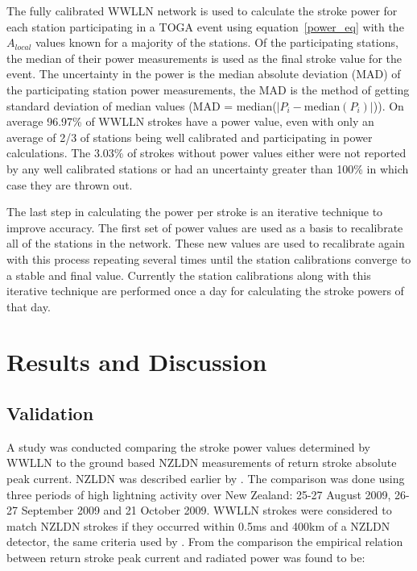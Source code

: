 The fully calibrated WWLLN network is used to calculate the stroke power for each station participating in a TOGA event using equation~\ref{power_eq} with the $A_{local}$ values known for a majority of the stations.
Of the participating stations, the median of their power measurements is used as the final stroke value for the event.
The uncertainty in the power is the median absolute deviation (MAD) of the participating station power measurements, the MAD is the method of getting standard deviation of median values (MAD = median($|P_i - $median$(P_i)|$)).
On average 96.97\% of WWLLN strokes have a power value, even with only an average of 2/3 of stations being well calibrated and participating in power calculations.
The 3.03\% of strokes without power values either were not reported by any well calibrated stations or had an uncertainty greater than 100\% in which case they are thrown out.

The last step in calculating the power per stroke is an iterative technique to improve accuracy.
The first set of power values are used as a basis to recalibrate all of the stations in the network.
These new values are used to recalibrate again with this process repeating several times until the station calibrations converge to a stable and final value.
Currently the station calibrations along with this iterative technique are performed once a day for calculating the stroke powers of that day.

\section{Results and Discussion}

\subsection{Validation}

A study was conducted comparing the stroke power values determined by WWLLN to the ground based NZLDN measurements of return stroke absolute peak current. NZLDN was described earlier by \citet{Rodger2006}.
The comparison was done using three periods of high lightning activity over New Zealand: 25-27 August 2009, 26-27 September 2009 and 21 October 2009.
WWLLN strokes were considered to match NZLDN strokes if they occurred within 0.5ms and 400km of a NZLDN detector, the same criteria used by \citet{Rodger2006}.
From the comparison the empirical relation between return stroke peak current and radiated power was found to be: 

